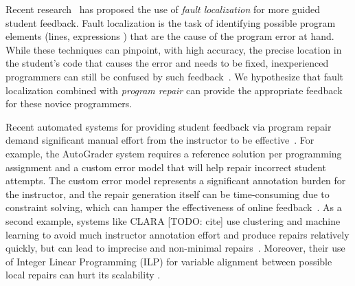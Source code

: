 Recent research~\citep[][]{Seidel:2017, Zhang2014-lv} has proposed the use of
\emph{fault localization} for more guided student feedback. Fault localization is the
task of identifying possible program elements (\eg lines, expressions \etc) that
are the cause of the program error at hand. While these techniques can pinpoint,
with high accuracy, the precise location in the student's code that causes the
error and needs to be fixed, inexperienced programmers can still be confused by
such feedback~\cite{FIXME}. We hypothesize that fault localization combined with
\emph{program repair}
can provide the appropriate feedback for these novice programmers.

Recent automated systems for providing student feedback via program repair
demand significant manual effort from the instructor to be
effective~\cite{FIXME}. For example, the AutoGrader system requires a
reference solution per programming assignment and a custom error model that
will help
repair incorrect student attempts. The custom error model represents a
significant annotation burden for the instructor, and the repair generation
itself can be time-consuming due to constraint solving, which can hamper
the effectiveness of online feedback~\cite{FIXME}.
As a second example, systems like CLARA [TODO: cite] use
clustering and machine learning to avoid much instructor annotation effort
and produce repairs relatively quickly, but can
lead to
imprecise and non-minimal repairs~\cite{FIXME}.
Moreover, their use of Integer Linear
Programming (ILP) for variable alignment between possible local repairs can hurt
its scalability .

